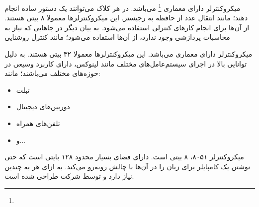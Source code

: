 
میکروکنترلر  دارای معماری  \footnote{} می‌باشد. در هر کلاک می‌توانند یک دستور ساده انجام دهند؛ مانند انتقال عدد از حافظه به رجیستر. این میکروکنترلرها معمولا ۸ بیتی هستند. از آن‌ها برای انجام کارهای کنترلی استفاده می‌شود. به بیان دیگر در جاهایی که نیاز به محاسبات پردازشی وجود ندارد، از آن‌ها استفاده می‌شود؛
مانند کنترل روشنایی

میکروکنترلر  دارای معماری  می‌باشد. این میکروکنترلرها معمولا ۳۲ بیتی هستند. به دلیل توانایی بالا در اجرای سیستم‌عامل‌های مختلف مانند لینوکس، دارای کاربرد وسیعی در حوزه‌های مختلف می‌باشند؛ مانند:
\begin{itemize}
	\item تبلت
	\item دوربین‌های دیجیتال
	\item تلفن‌های همراه
	\item و...
\end{itemize}

میکروکنترلر ۸۰۵۱، ۸ بیتی است. دارای فضای  بسیار محدود ۱۲۸ بایتی است که حتی نوشتن یک کامپایلر برای زبان  را در آن‌ها با چالش روبه‌رو می‌کند. به ازای هر  به چندین  نیاز دارد و توسط شرکت  طراحی شده است.

